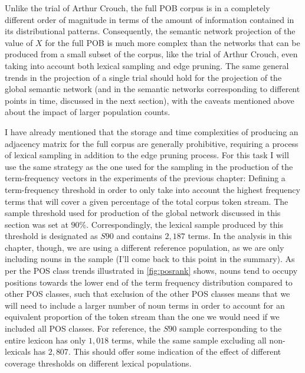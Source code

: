 Unlike the trial of Arthur Crouch, the full POB corpus is in a completely different order of magnitude in terms of the amount of information contained in its distributional patterns.
Consequently, the semantic network projection of the value of $X$ for the full POB is much more complex than the networks that can be produced from a small subset of the corpus, like the trial of Arthur Crouch, even taking into account both lexical sampling and edge pruning.
The same general trends in the projection of a single trial should hold for the projection of the global semantic network (and in the semantic networks corresponding to different points in time, discussed in the next section), with the caveats mentioned above about the impact of larger population counts.

I have already mentioned that the storage and time complexities of producing an adjacency matrix for the full corpus are generally prohibitive, requiring a process of lexical sampling in addition to the edge pruning process.
For this task I will use the same strategy as the one used for the sampling in the production of the term-frequency vectors in the experiments of the previous chapter:
Defining a term-frequency threshold in order to only take into account the highest frequency terms that will cover a given percentage of the total corpus token stream.
The sample threshold used for production of the global network discussed in this section was set at $90\%$.
Correspondingly, the lexical sample produced by this threshold is designated as $S90$ and contains $2,187$ terms.
In the analysis in this chapter, though, we are using a different reference population, as we are only including nouns in the sample (I'll come back to this point in the summary).
As per the POS class trends illustrated in \autoref{fig:posrank} shows, nouns tend to occupy positions towards the lower end of the term frequency distribution compared to other POS classes, such that exclusion of the other POS classes means that we will need to include a larger number of noun terms in order to account for an equivalent proportion of the token stream than the one we would need if we included all POS classes.
For reference, the $S90$ sample corresponding to the entire lexicon has only $1,018$ terms, while the same sample excluding all non-lexicals has $2,807$.
This should offer some indication of the effect of different coverage thresholds on different lexical populations.


